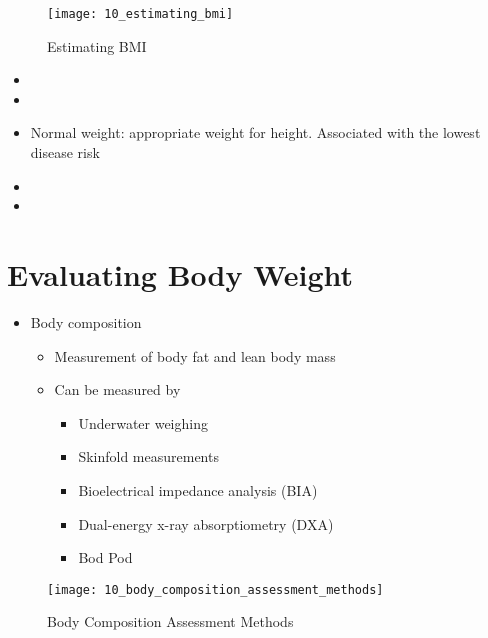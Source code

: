 \documentclass[title={Chapter 10: Achieving and Maintaining a Healthful Body Weight}]{fdsn201notes}
\begin{document}
\begin{figure}[H]
	\centering
	\texttt{[image: 10\_estimating\_bmi]}
	\caption{Estimating BMI}
	\label{fig:estimating-bmi}
\end{figure}

\begin{itemize}
	\item {}
	\item {}
	\item Normal weight: appropriate weight for height. Associated with the lowest disease risk
	\item {}
	\item {}
\end{itemize}

\section{Evaluating Body Weight}\label{sec:evaluating-body-weight2}
\begin{itemize}
	\item Body composition
	\begin{itemize}
		\item Measurement of body fat and lean body mass
		\item Can be measured by
		\begin{itemize}
			\item Underwater weighing
			\item Skinfold measurements
			\item Bioelectrical impedance analysis (BIA)
			\item Dual-energy x-ray absorptiometry (DXA)
			\item Bod Pod
		\end{itemize}
	\end{itemize}
\end{itemize}

\begin{figure}[H]
	\centering
	\texttt{[image: 10\_body\_composition\_assessment\_methods]}
	\caption{Body Composition Assessment Methods}
	\label{fig:body-composition-assessment-methods}
\end{figure}
\end{document}
